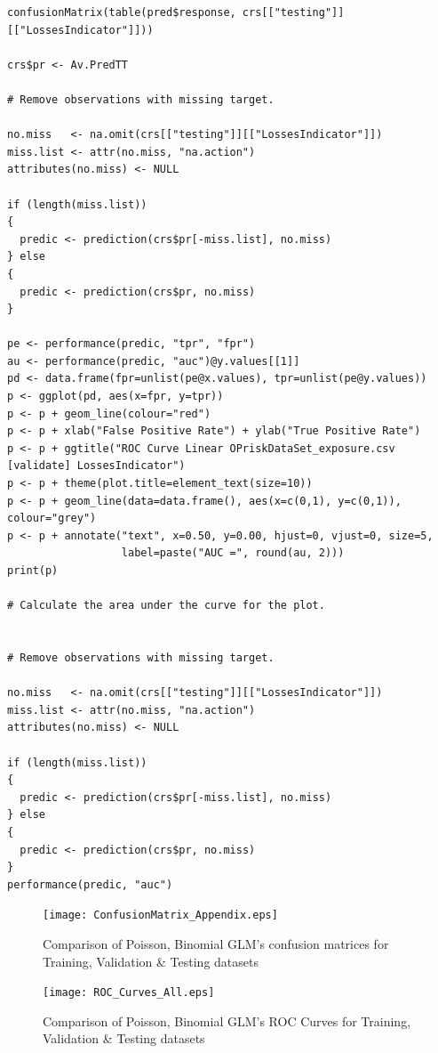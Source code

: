 \documentclass{DissertateUSU}
\begin{document}
\begin{verbatim}
confusionMatrix(table(pred$response, crs[["testing"]][["LossesIndicator"]]))

crs$pr <- Av.PredTT

# Remove observations with missing target.

no.miss   <- na.omit(crs[["testing"]][["LossesIndicator"]])
miss.list <- attr(no.miss, "na.action")
attributes(no.miss) <- NULL

if (length(miss.list))
{
  predic <- prediction(crs$pr[-miss.list], no.miss)
} else
{
  predic <- prediction(crs$pr, no.miss)
}

pe <- performance(predic, "tpr", "fpr")
au <- performance(predic, "auc")@y.values[[1]]
pd <- data.frame(fpr=unlist(pe@x.values), tpr=unlist(pe@y.values))
p <- ggplot(pd, aes(x=fpr, y=tpr))
p <- p + geom_line(colour="red")
p <- p + xlab("False Positive Rate") + ylab("True Positive Rate")
p <- p + ggtitle("ROC Curve Linear OPriskDataSet_exposure.csv [validate] LossesIndicator")
p <- p + theme(plot.title=element_text(size=10))
p <- p + geom_line(data=data.frame(), aes(x=c(0,1), y=c(0,1)), colour="grey")
p <- p + annotate("text", x=0.50, y=0.00, hjust=0, vjust=0, size=5,
                  label=paste("AUC =", round(au, 2)))
print(p)

# Calculate the area under the curve for the plot.


# Remove observations with missing target.

no.miss   <- na.omit(crs[["testing"]][["LossesIndicator"]])
miss.list <- attr(no.miss, "na.action")
attributes(no.miss) <- NULL

if (length(miss.list))
{
  predic <- prediction(crs$pr[-miss.list], no.miss)
} else
{
  predic <- prediction(crs$pr, no.miss)
}
performance(predic, "auc")
\end{verbatim}

\begin{figure}
\centering
\texttt{[image: ConfusionMatrix\_Appendix.eps]}
\caption[Confusion Matrices comparison]{Comparison of Poisson, Binomial GLM's confusion matrices for Training, Validation \& Testing datasets}
\label{ConfusionMatrixAll}
\end{figure}

\begin{figure}
\centering
\texttt{[image: ROC\_Curves\_All.eps]}
\caption[ROC Curve comparison]{Comparison of Poisson, Binomial GLM's ROC Curves for Training, Validation \& Testing datasets}
\label{ROCCurveAll}
\end{figure}
\end{document}
